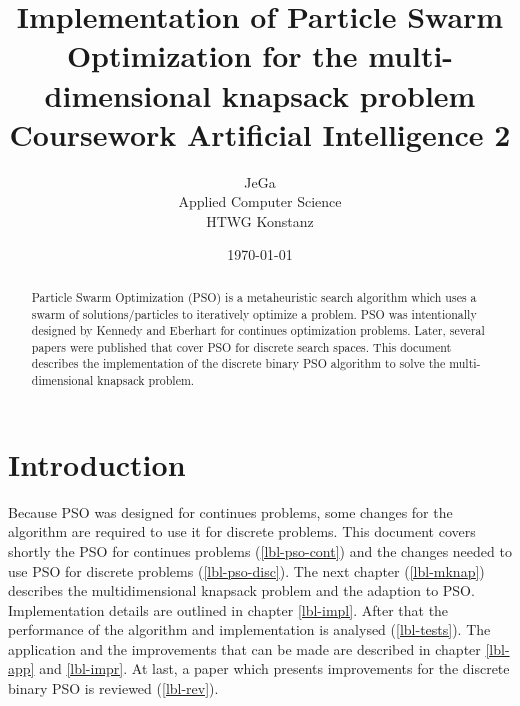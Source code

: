 \documentclass{article}
\begin{document}
\title{Implementation of Particle Swarm Optimization for the multi-dimensional knapsack problem \\
\vspace{2 mm} {\large Coursework Artificial Intelligence 2}}
\author{JeGa\\
        Applied Computer Science\\
		HTWG Konstanz}
\date{\today}
\maketitle

\begin{abstract}
Particle Swarm Optimization (PSO) is a metaheuristic search algorithm which uses a swarm of solutions/particles to iteratively optimize a problem. PSO was intentionally designed by Kennedy and Eberhart \cite{bib-continues} for continues optimization problems. Later, several papers were published that cover PSO for discrete search spaces. This document describes the implementation of the discrete binary PSO algorithm to solve the multi-dimensional knapsack problem.
\end{abstract}

\newpage
\cfoot[\thepage]{}

\tableofcontents

\newpage

\section{Introduction}
\label{lbl-intro}
Because PSO was designed for continues problems, some changes for the algorithm are required to use it for discrete problems. This document covers shortly the PSO for continues problems (\ref{lbl-pso-cont}) and the changes needed to use PSO for discrete problems (\ref{lbl-pso-disc}). The next chapter (\ref{lbl-mknap}) describes the multidimensional knapsack problem and the adaption to PSO.
Implementation details are outlined in chapter \ref{lbl-impl}. After that the performance of the algorithm and implementation is analysed (\ref{lbl-tests}). The application and the improvements that can be made are described in chapter \ref{lbl-app} and \ref{lbl-impr}. At last, a paper which presents improvements for the discrete binary PSO is reviewed (\ref{lbl-rev}).
\end{document}
